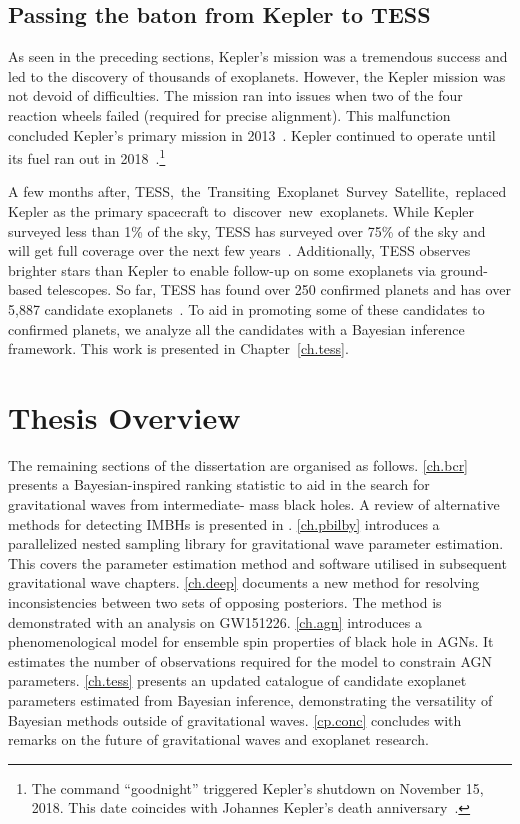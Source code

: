 \subsection{Passing the baton from Kepler to TESS }
As seen in the preceding sections, Kepler's mission was a tremendous success and led to the discovery of thousands of exoplanets.
However, the Kepler mission was not devoid of difficulties.
The mission ran into issues when two of the four reaction wheels failed (required for precise alignment). 
This malfunction concluded Kepler's primary mission in 2013~\cite{cowen2013wheels}.
Kepler continued to operate until its fuel ran out in 2018~\cite{KeplerShutdown}.\footnote{The command ``goodnight'' triggered Kepler's shutdown on November 15, 2018. This date coincides with Johannes Kepler's death anniversary~\cite{KeplerShutdown}.}

A few months after, TESS, the Transiting Exoplanet Survey Satellite, replaced Kepler as the primary spacecraft to discover new exoplanets.
While Kepler surveyed less than 1\% of the sky, TESS has surveyed over 75\% of the sky and will get full coverage over the next few years~\cite{tess}. 
Additionally, TESS observes brighter stars than Kepler to enable follow-up on some exoplanets via ground-based telescopes.  
So far, TESS has found over 250 confirmed planets and has over 5,887 candidate exoplanets~\cite{Akeson:2019:AAS,  Stassun:2019:AJ}. 
To aid in promoting some of these candidates to confirmed planets, we analyze all the candidates with a Bayesian inference framework. 
This work is presented in Chapter~\ref{ch.tess}.


\section{Thesis Overview}
The remaining sections of the dissertation are organised as follows. 
\cref{ch.bcr} presents a Bayesian-inspired ranking statistic to aid in the search for gravitational waves from intermediate- mass black holes. 
A review of alternative methods for detecting IMBHs is presented in . 
\cref{ch.pbilby} introduces a parallelized nested sampling library for gravitational wave parameter estimation. 
This covers the parameter estimation method and software utilised in subsequent gravitational wave chapters. 
\cref{ch.deep} documents a new method for resolving inconsistencies between two sets of opposing posteriors. The method is demonstrated with an analysis on GW151226. 
\cref{ch.agn} introduces a phenomenological model for ensemble spin properties of black hole in AGNs. It estimates the number of observations required for the model to constrain AGN parameters. 
\cref{ch.tess} presents an updated catalogue of candidate exoplanet parameters estimated from Bayesian inference, demonstrating the versatility of Bayesian methods outside of gravitational waves.
\cref{cp.conc} concludes with remarks on the future of gravitational waves and exoplanet research.

